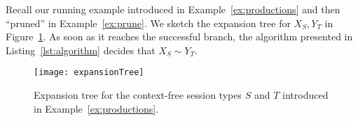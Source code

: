 \begin{example}
	Recall our running example introduced in Example~\ref{ex:productions} and then
	``pruned'' in Example~\ref{ex:prune}. We sketch the expansion tree for
	$X_S, Y_T$ in Figure~\ref{fig:expansionTree}. As soon as it reaches
	the successful branch, the algorithm presented in Listing~\ref{lst:algorithm}
	decides that $X_S\sim Y_T$.
\end{example}

\begin{figure}[h]
\centering
	\texttt{[image: expansionTree]}
	\caption{Expansion tree for the context-free session types $S$ and $T$
	introduced in Example~\ref{ex:productions}.}
	\label{fig:expansionTree}
\end{figure}
